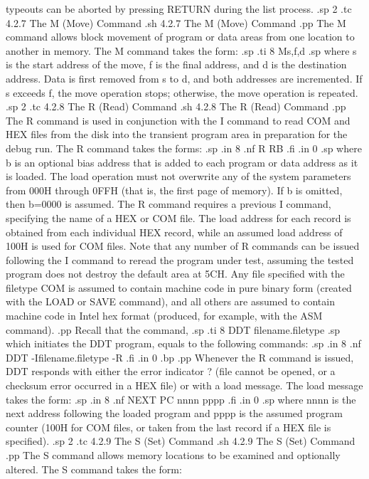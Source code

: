 typeouts can be aborted by pressing RETURN during the list 
process.
.sp 2
.tc         4.2.7  The M (Move) Command
.sh
4.2.7  The M (Move) Command
.pp
The M command allows block movement of program or data areas from 
one location to another in memory.  The M command takes the form:
.sp
.ti 8
Ms,f,d
.sp
where s is the start address of the move, f is the final address, 
and d is the destination address.  Data is first removed from s 
to d, and both addresses are incremented.  If s exceeds f, the 
move operation stops; otherwise, the move operation is repeated.
.sp 2
.tc         4.2.8  The R (Read) Command
.sh
4.2.8  The R (Read) Command
.pp
The R command is used in conjunction with the I command to read 
COM and HEX files from the disk into the transient program 
area in preparation for the debug run.  The R command takes the forms:
.sp
.in 8
.nf
R
RB
.fi
.in 0
.sp
where b is an optional bias address that is added to each program 
or data address as it is loaded.  The load operation must not 
overwrite any of the system parameters from 000H through 0FFH 
(that is, the first page of memory).  If b is omitted, then 
b=0000 is assumed.  The R command requires a previous I command, 
specifying the name of a HEX or COM file.  The load address for 
each record is obtained from each individual HEX record, while an 
assumed load address of 100H is used for COM files.  Note that 
any number of R commands can be issued following the I command to 
reread the program under test, assuming the tested program does 
not destroy the default area at 5CH.  Any file specified with the 
filetype COM is assumed to contain machine code in pure binary 
form (created with the LOAD or SAVE command), and all others are 
assumed to contain machine code in Intel hex format (produced, 
for example, with the ASM command).
.pp
Recall that the command,
.sp
.ti 8
DDT filename.filetype
.sp
which initiates the DDT program, equals to the following commands:
.sp 
.in 8
.nf
DDT
-Ifilename.filetype
-R
.fi
.in 0
.bp
.pp
Whenever the R command is issued, DDT responds with either the 
error indicator ? (file cannot be opened, or a checksum error 
occurred in a HEX file) or with a load message.  The load message 
takes the form:
.sp 
.in 8
.nf
NEXT PC
nnnn pppp
.fi
.in 0
.sp
where nnnn is the next address following the loaded program and 
pppp is the assumed program counter (100H for COM files, or 
taken from the last record if a HEX file is specified).
.sp 2
.tc         4.2.9  The S (Set) Command
.sh
4.2.9  The S (Set) Command
.pp
The S command allows memory locations to be examined and 
optionally altered.  The S command takes the form:
